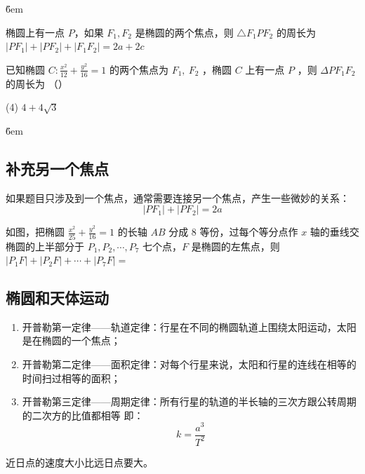 \v{6em}

\begin{theorem}[焦点三角形的周长]
    椭圆上有一点 $P$，如果 $F_1, F_2$ 是椭圆的两个焦点，则 $\triangle F_1 P F_2$ 的周长为 $|PF_1| + |PF_2| + |F_1F_2|= 2a + 2c$
\end{theorem}

\begin{example}
    已知椭圆 $C: \frac{x^2}{12}+\frac{y^2}{16}=1$ 的两个焦点为 $F_1, ~ F_2$ ，椭圆 $C$ 上有一点 $P$ ，则 $\Delta P F_1 F_2$ 的周长为 （\qquad）
    \begin{tasks}(4)
        \task $4+4 \sqrt{3}$
    \end{tasks}
\end{example}

\v{6em}

\subsection{补充另一个焦点}

\begin{theorem}
    如果题目只涉及到一个焦点，通常需要连接另一个焦点，产生一些微妙的关系：
    $$|PF_1|+|PF_2|=2a$$
\end{theorem}

\begin{example}
    如图，把椭圆 $\frac{x^2}{25}+\frac{y^2}{16}=1$ 的长轴 $A B$ 分成 8 等份，过每个等分点作 $x$ 轴的垂线交椭圆的上半部分于 $P_1, P_2, \cdots, P_7$ 七个点，$F$ 是椭圆的左焦点，则 $\left|P_1 F\right|+\left|P_2 F\right|+\cdots+\left|P_7 F\right|=$
    \begin{figure} [H]
        \centering
        \resizebox{0.25\textwidth}{!}{}
    \end{figure}
\end{example}

\subsection{椭圆和天体运动}

\begin{theorem}[开普勒三大定律]

    \begin{enumerate}
        \item 开普勒第一定律——轨道定律：行星在不同的椭圆轨道上围绕太阳运动，太阳是在椭圆的一个焦点；
        \item 开普勒第二定律——面积定律：对每个行星来说，太阳和行星的连线在相等的时间扫过相等的面积；
        \item 开普勒第三定律——周期定律：所有行星的轨道的半长轴的三次方跟公转周期的二次方的比值都相等 即：
              $$
                  k=\frac{a^3}{T^2}
              $$
    \end{enumerate}

    \begin{corollary}[近日点和远日点]
        近日点的速度大小比远日点要大。
    \end{corollary}
\end{theorem}

